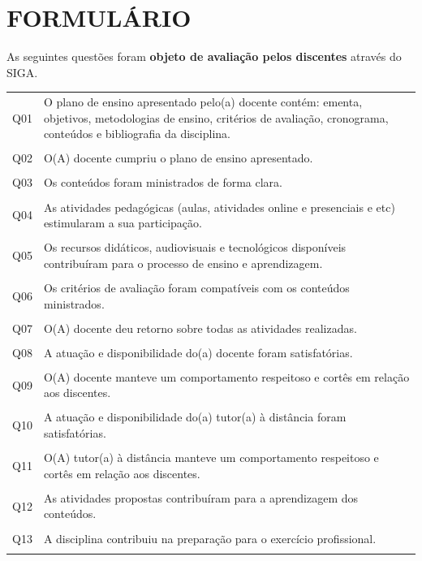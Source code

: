 \documentclass[a4paper,10pt]{article}
\begin{document}
\section{FORMULÁRIO}
As seguintes questões foram {\bf objeto de avaliação pelos discentes} através do SIGA.

\small{
\begin{center}
\begin{tabularx}{\linewidth}{l|X}
Q01&O plano de ensino apresentado pelo(a) docente contém: ementa, objetivos, metodologias de ensino, critérios de avaliação, cronograma, conteúdos e bibliografia da disciplina.\\\\
Q02&O(A) docente cumpriu o plano de ensino apresentado.\\\\
Q03&Os conteúdos foram ministrados de forma clara.\\\\
Q04&As atividades pedagógicas (aulas, atividades online e presenciais e etc) estimularam a sua participação.\\\\
Q05&Os recursos didáticos, audiovisuais e tecnológicos disponíveis contribuíram para o processo de ensino e aprendizagem.\\\\
Q06&Os critérios de avaliação foram compatíveis com os conteúdos ministrados.\\\\
Q07&O(A) docente deu retorno sobre todas as atividades realizadas.\\\\
Q08&A atuação e disponibilidade do(a) docente foram satisfatórias.\\\\
Q09&O(A) docente manteve um comportamento respeitoso e cortês em relação aos discentes.\\\\
Q10&A atuação e disponibilidade do(a) tutor(a) à distância foram satisfatórias.\\\\
Q11&O(A) tutor(a) à distância manteve um comportamento respeitoso e cortês em relação aos discentes.\\\\
Q12&As atividades propostas contribuíram para a aprendizagem dos conteúdos.\\\\
Q13&A disciplina contribuiu na preparação para o exercício profissional.\\\\

\end{tabularx}
\end{center}}
\end{document}
